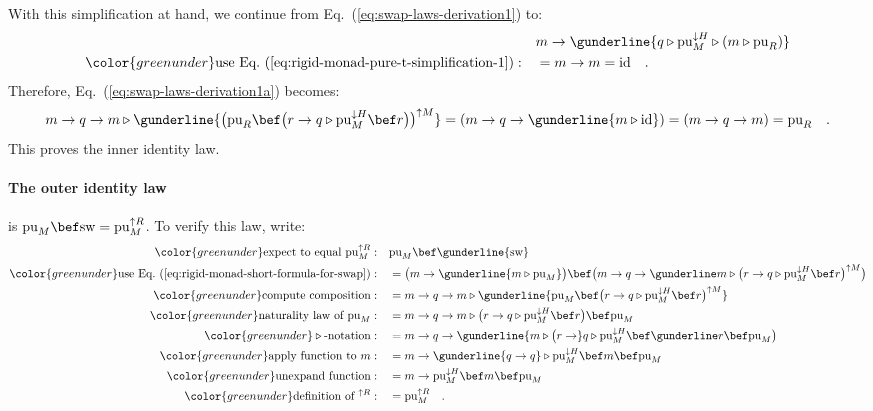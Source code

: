 With this simplification at hand, we continue from Eq.~(\ref{eq:swap-laws-derivation1})
to:
\begin{align*}
 & m\rightarrow\gunderline{q\triangleright\text{pu}_{M}^{\downarrow H}\triangleright\left(m\triangleright\text{pu}_{R}\right)}\\
{\color{greenunder}\text{use Eq.~(\ref{eq:rigid-monad-pure-t-simplification-1})}:}\quad & =m\rightarrow m=\text{id}\quad.
\end{align*}
Therefore, Eq.~(\ref{eq:swap-laws-derivation1a}) becomes:
\[
m\rightarrow q\rightarrow m\triangleright\gunderline{\big(\text{pu}_{R}\bef\big(r\rightarrow q\triangleright\text{pu}_{M}^{\downarrow H}\bef r\big)\big)^{\uparrow M}}=(m\rightarrow q\rightarrow\gunderline{m\triangleright\text{id}})=(m\rightarrow q\rightarrow m)=\text{pu}_{R}\quad.
\]
This proves the inner identity law.

\paragraph{The outer identity law}

is $\text{pu}_{M}\bef\text{sw}=\text{pu}_{M}^{\uparrow R}$. To verify
this law, write:
\begin{align*}
{\color{greenunder}\text{expect to equal }\text{pu}_{M}^{\uparrow R}:}\quad & \text{pu}_{M}\bef\gunderline{\text{sw}}\\
{\color{greenunder}\text{use Eq.~(\ref{eq:rigid-monad-short-formula-for-swap})}:}\quad & =\big(m\rightarrow\gunderline{m\triangleright\text{pu}_{M}}\big)\bef\big(m\rightarrow q\rightarrow\gunderline m\triangleright\big(r\rightarrow q\triangleright\text{pu}_{M}^{\downarrow H}\bef r\big)^{\uparrow M}\big)\\
{\color{greenunder}\text{compute composition}:}\quad & =m\rightarrow q\rightarrow m\triangleright\gunderline{\text{pu}_{M}\bef\big(r\rightarrow q\triangleright\text{pu}_{M}^{\downarrow H}\bef r\big)^{\uparrow M}}\\
{\color{greenunder}\text{naturality law of }\text{pu}_{M}:}\quad & =m\rightarrow q\rightarrow m\triangleright\big(r\rightarrow q\triangleright\text{pu}_{M}^{\downarrow H}\bef r\big)\bef\text{pu}_{M}\\
{\color{greenunder}\triangleright\text{-notation}:}\quad & =m\rightarrow q\rightarrow\gunderline{m\triangleright\big(r\rightarrow}q\triangleright\text{pu}_{M}^{\downarrow H}\bef\gunderline r\bef\text{pu}_{M}\big)\\
{\color{greenunder}\text{apply function to }m:}\quad & =m\rightarrow\gunderline{q\rightarrow q}\triangleright\text{pu}_{M}^{\downarrow H}\bef m\bef\text{pu}_{M}\\
{\color{greenunder}\text{unexpand function}:}\quad & =m\rightarrow\text{pu}_{M}^{\downarrow H}\bef m\bef\text{pu}_{M}\\
{\color{greenunder}\text{definition of }{}^{\uparrow R}:}\quad & =\text{pu}_{M}^{\uparrow R}\quad.
\end{align*}



